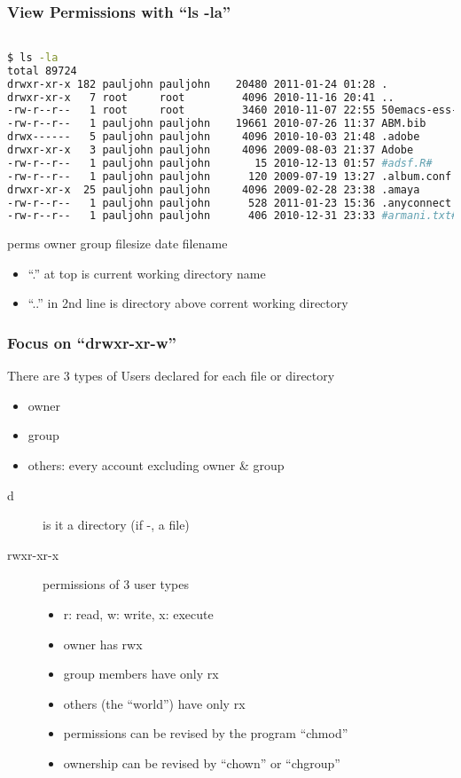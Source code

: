 \documentclass[English]{beamer}
\begin{document}
\begin{frame}[containsverbatim]
  \frametitle{View Permissions with ``ls -la''}


\begin{lstlisting}[basicstyle={\tiny},breaklines=true,language=bash]

$ ls -la
total 89724
drwxr-xr-x 182 pauljohn pauljohn    20480 2011-01-24 01:28 .
drwxr-xr-x   7 root     root         4096 2010-11-16 20:41 ..
-rw-r--r--   1 root     root         3460 2010-11-07 22:55 50emacs-ess-ku.el
-rw-r--r--   1 pauljohn pauljohn    19661 2010-07-26 11:37 ABM.bib
drwx------   5 pauljohn pauljohn     4096 2010-10-03 21:48 .adobe
drwxr-xr-x   3 pauljohn pauljohn     4096 2009-08-03 21:37 Adobe
-rw-r--r--   1 pauljohn pauljohn       15 2010-12-13 01:57 #adsf.R#
-rw-r--r--   1 pauljohn pauljohn      120 2009-07-19 13:27 .album.conf
drwxr-xr-x  25 pauljohn pauljohn     4096 2009-02-28 23:38 .amaya
-rw-r--r--   1 pauljohn pauljohn      528 2011-01-23 15:36 .anyconnect
-rw-r--r--   1 pauljohn pauljohn      406 2010-12-31 23:33 #armani.txt#
\end{lstlisting}

perms         owner     group      filesize  date   filename

\begin{itemize}
\item ``.'' at top is current working directory name
\item ``..'' in 2nd line is directory above corrent working directory
\end{itemize}

\end{frame}

\begin{frame}[containsverbatim]
  \frametitle{Focus on ``drwxr-xr-w''}

 There are 3 types of Users declared for each file or directory
  \begin{itemize}
  \item owner
  \item group
  \item others: every account excluding owner \& group
  \end{itemize}
\begin{description}
\item[d] is it a directory (if -, a file)
\item[rwxr-xr-x] permissions of 3 user types
  \begin{itemize}
  \item r: read, w: write, x: execute
  \item owner has rwx
  \item group members have only rx
  \item others (the ``world'') have only rx
  \item permissions can be revised by the program ``chmod''
  \item ownership can be revised by ``chown'' or ``chgroup''
\end{itemize}
\end{description}
\end{frame}
\end{document}
